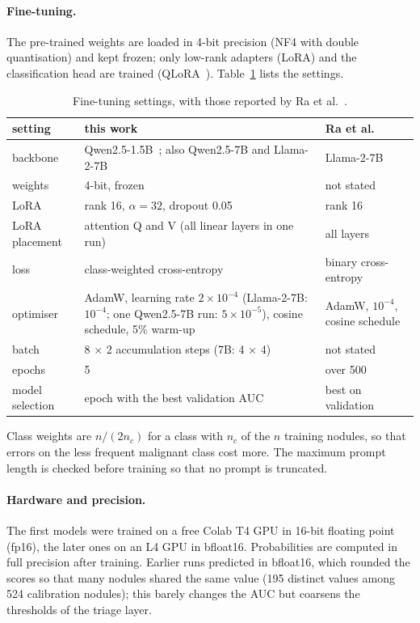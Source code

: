\paragraph{Fine-tuning.} The pre-trained weights are loaded in 4-bit precision (NF4 with double
quantisation) and kept frozen; only low-rank adapters (LoRA) and the classification head are
trained (QLoRA~\citep{hu2022lora,dettmers2023qlora}). Table~\ref{tab:methods-llm} lists the
settings.

\begin{table}[ht]
  \centering
  \small
  \caption{Fine-tuning settings, with those reported by Ra et al.~\citep{ra2025}.}
  \label{tab:methods-llm}
  \begin{tabular}{lp{6.2cm}p{3.6cm}}
    \toprule
    setting & this work & Ra et al. \\
    \midrule
    backbone        & Qwen2.5-1.5B~\citep{qwen2024}; also Qwen2.5-7B and Llama-2-7B & Llama-2-7B~\citep{touvron2023llama2} \\
    weights         & 4-bit, frozen & not stated \\
    LoRA            & rank 16, $\alpha = 32$, dropout 0.05 & rank 16 \\
    LoRA placement  & attention Q and V (all linear layers in one run) & all layers \\
    loss            & class-weighted cross-entropy & binary cross-entropy \\
    optimiser       & AdamW, learning rate $2 \times 10^{-4}$ (Llama-2-7B: $10^{-4}$; one Qwen2.5-7B run: $5 \times 10^{-5}$), cosine schedule, 5\% warm-up & AdamW, $10^{-4}$, cosine schedule \\
    batch           & 8 $\times$ 2 accumulation steps (7B: 4 $\times$ 4) & not stated \\
    epochs          & 5 & over 500 \\
    model selection & epoch with the best validation AUC & best on validation \\
    \bottomrule
  \end{tabular}
\end{table}

Class weights are $n / (2 n_c)$ for a class with $n_c$ of the $n$ training nodules, so that
errors on the less frequent malignant class cost more. The maximum prompt length is checked
before training so that no prompt is truncated.

\paragraph{Hardware and precision.} The first models were trained on a free Colab T4 GPU in
16-bit floating point (fp16), the later ones on an L4 GPU in bfloat16. Probabilities are computed
in full precision after training. Earlier runs predicted in bfloat16, which rounded the scores so
that many nodules shared the same value (195 distinct values among 524 calibration nodules); this
barely changes the AUC but coarsens the thresholds of the triage layer.

